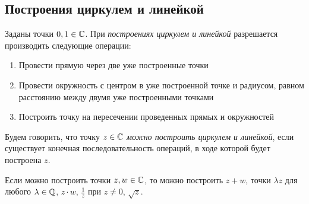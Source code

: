 \subsection{Построения циркулем и линейкой}

\begin{definition}
	Заданы точки $0, 1 \in \mathbb{C}$. При \textit{построениях циркулем и линейкой} разрешается производить следующие операции:
	\begin{enumerate}
		\item Провести прямую через две уже построенные точки
		\item Провести окружность с центром в уже построенной точке и радиусом, равном расстоянию между двумя уже построенными точками
		\item Построить точку на пересечении проведенных прямых и окружностей
	\end{enumerate}

	Будем говорить, что точку $z \in \mathbb{C}$ \textit{можно построить циркулем и линейкой}, если существует конечная последовательность операций, в ходе которой будет построена $z$.
\end{definition}

\begin{proposition}
	Если можно построить точки $z, w \in \mathbb{C}$, то можно построить $z + w$, точки $\lambda z$ для любого $\lambda \in \mathbb{Q}$, $z \cdot w$, $\frac 1z$ при $z \ne 0$, $\sqrt{z}$.
\end{proposition}

